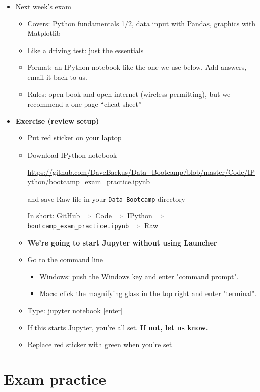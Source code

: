 \documentclass[11pt]{article}
\begin{document}
\begin{itemize}
\item Next week's exam
\begin{itemize}
\item Covers:  Python fundamentals 1/2, data input with Pandas, graphics with Matplotlib
\item Like a driving test:  just the essentials
\item Format:  an IPython notebook like the one we use below.  Add answers, email it back to us.
\item Rules:  open book and open internet (wireless permitting), but we recommend a one-page ``cheat sheet''
\end{itemize}

\item {\bf Exercise (review setup)}
\begin{itemize}
\item Put red sticker on your laptop

\item Download IPython notebook

\url{https://github.com/DaveBackus/Data_Bootcamp/blob/master/Code/IPython/bootcamp_exam_practice.ipynb} %

and save Raw file in your \verb|Data_Bootcamp| directory

In short:  GitHub $\Rightarrow$ Code $\Rightarrow$ IPython $\Rightarrow$ \verb|bootcamp_exam_practice.ipynb|
$\Rightarrow$ Raw

\item {\bf We're going to start Jupyter without using Launcher}
\item Go to the command line
\begin{itemize}
\item Windows:  push the Windows key and enter "command prompt".
\item Macs:  click the magnifying glass in the top right and enter "terminal".
\end{itemize}
\item Type:  jupyter notebook [enter]
\item If this starts Jupyter, you're all set.  {\bf If not, let us know.}
\item Replace red sticker with green when you're set
\end{itemize}

\end{itemize}


\section*{Exam practice}
\end{document}
